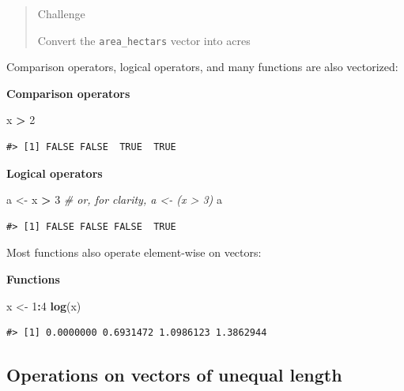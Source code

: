 \documentclass[
]{book}
\newenvironment{Shaded}{\begin{snugshade}}{\end{snugshade}}
\newcommand{\CommentTok}[1]{\textcolor[rgb]{0.56,0.35,0.01}{\textit{#1}}}
\newcommand{\DecValTok}[1]{\textcolor[rgb]{0.00,0.00,0.81}{#1}}
\newcommand{\FunctionTok}[1]{\textcolor[rgb]{0.13,0.29,0.53}{\textbf{#1}}}
\newcommand{\NormalTok}[1]{#1}
\newcommand{\OtherTok}[1]{\textcolor[rgb]{0.56,0.35,0.01}{#1}}
\newcommand{\SpecialCharTok}[1]{\textcolor[rgb]{0.81,0.36,0.00}{\textbf{#1}}}
\begin{document}
\begin{quote}
Challenge

Convert the \texttt{area\_hectars} vector into acres
\end{quote}

Comparison operators, logical operators, and many functions are also
vectorized:

\textbf{Comparison operators}

\begin{Shaded}
\begin{Highlighting}[]
\NormalTok{x }\SpecialCharTok{\textgreater{}} \DecValTok{2}
\end{Highlighting}
\end{Shaded}

\begin{verbatim}
#> [1] FALSE FALSE  TRUE  TRUE
\end{verbatim}

\textbf{Logical operators}

\begin{Shaded}
\begin{Highlighting}[]
\NormalTok{a }\OtherTok{\textless{}{-}}\NormalTok{ x }\SpecialCharTok{\textgreater{}} \DecValTok{3}  \CommentTok{\# or, for clarity, a \textless{}{-} (x \textgreater{} 3)}
\NormalTok{a}
\end{Highlighting}
\end{Shaded}

\begin{verbatim}
#> [1] FALSE FALSE FALSE  TRUE
\end{verbatim}

Most functions also operate element-wise on vectors:

\textbf{Functions}

\begin{Shaded}
\begin{Highlighting}[]
\NormalTok{x }\OtherTok{\textless{}{-}} \DecValTok{1}\SpecialCharTok{:}\DecValTok{4}
\FunctionTok{log}\NormalTok{(x)}
\end{Highlighting}
\end{Shaded}

\begin{verbatim}
#> [1] 0.0000000 0.6931472 1.0986123 1.3862944
\end{verbatim}

\subsection{Operations on vectors of unequal length}\label{operations-on-vectors-of-unequal-length}
\end{document}
